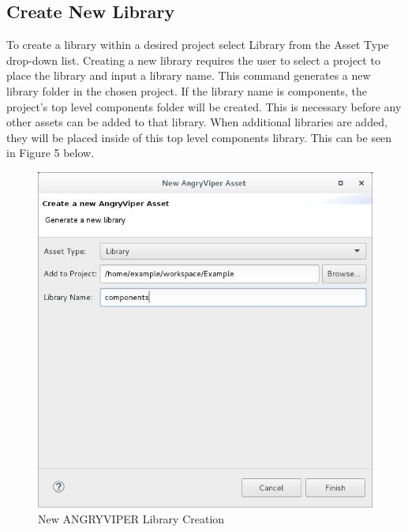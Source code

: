 \newpage

\subsection{Create New Library}
\label{sec:create_library}
\begin{flushleft}

To create a library within a desired project select Library from the Asset Type drop-down list. Creating a new library requires the user to select a project to place the library and input a library name. This command generates a new library folder in the chosen project. If the library name is components, the project's top level components folder will be created. This is necessary before any other assets can be added to that library. When additional libraries are added, they will be placed inside of this top level components library. This can be seen in Figure 5 below.\newline
\begin{figure}[h!]
  \centering
  \includegraphics[scale=0.5]{figures/createlibrary.jpg}
  \caption{New ANGRYVIPER Library Creation}
  \label{fig:figure4}
\end{figure}


\end{flushleft}
